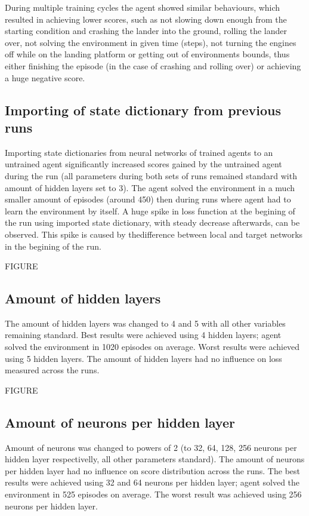 \documentclass{article}
\begin{document}
During multiple training cycles the agent showed similar behaviours, which resulted in achieving lower scores, such as not slowing down enough from the starting condition and crashing the lander into the ground, rolling the lander over, not solving the environment in given time (steps), not turning the engines off while on the landing platform or getting out of environments bounds, thus either finishing the episode (in the case of crashing and rolling over) or achieving a huge negative score.

\subsection*{Importing of state dictionary from previous runs}
Importing state dictionaries from neural networks of trained agents to an untrained agent significantly increased scores gained by the untrained agent during the run (all parameters during both sets of runs remained standard with amount of hidden layers set to 3). The agent solved the environment in a much smaller amount of episodes (around 450) then during runs where agent had to learn the environment by itself. A huge spike in loss function at the begining of the run using imported state dictionary, with steady decrease afterwards, can be observed. This spike is caused by thedifference between local and target networks in the begining of the run.

FIGURE

\subsection*{Amount of hidden layers}
The amount of hidden layers was changed to 4 and 5 with all other variables remaining standard. Best results were achieved using 4 hidden layers; agent solved the environment in 1020 episodes on average. Worst results were achieved using 5 hidden layers. The amount of hidden layers had no influence on loss measured across the runs.

FIGURE
\pagebreak

\subsection*{Amount of neurons per hidden layer}
Amount of neurons was changed to powers of 2 (to 32, 64, 128, 256 neurons per hidden layer respectivelly, all other parameters standard). The amount of neurons per hidden layer had no influence on score distribution across the runs. The best results were achieved using 32 and 64 neurons per hidden layer; agent solved the environment in 525 episodes on average. The worst result was achieved using 256 neurons per hidden layer.
\end{document}
